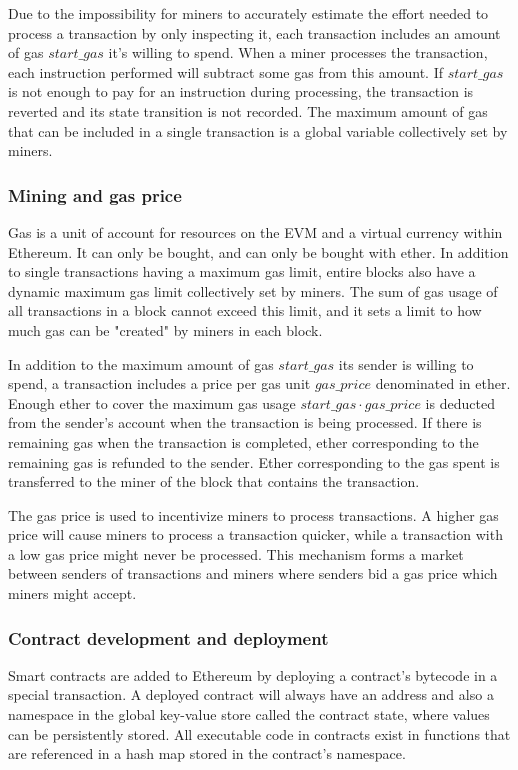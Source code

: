 Due to the impossibility for miners to accurately estimate the effort needed to process a transaction by only inspecting it, each transaction includes an amount of gas $start\_gas$ it's willing to spend. When a miner processes the transaction, each instruction performed will subtract some gas from this amount. If $start\_gas$ is not enough to pay for an instruction during processing, the transaction is reverted and its state transition is not recorded. The maximum amount of gas that can be included in a single transaction is a global variable collectively set by miners. 

\subsubsection{Mining and gas price}
Gas is a unit of account for resources on the EVM and a virtual currency within Ethereum. It can only be bought, and can only be bought with ether. In addition to single transactions having a maximum gas limit, entire blocks also have a dynamic maximum gas limit collectively set by miners. The sum of gas usage of all transactions in a block cannot exceed this limit, and it sets a limit to how much gas can be "created" by miners in each block. 

In addition to the maximum amount of gas $start\_gas$ its sender is willing to spend, a transaction includes a price per gas unit $gas\_price$ denominated in ether. Enough ether to cover the maximum gas usage $start\_gas \cdot gas\_price$ is deducted from the sender's account when the transaction is being processed. If there is remaining gas when the transaction is completed, ether corresponding to the remaining gas is refunded to the sender. Ether corresponding to the gas spent is transferred to the miner of the block that contains the transaction.

The gas price is used to incentivize miners to process transactions. A higher gas price will cause miners to process a transaction quicker, while a transaction with a low gas price might never be processed. This mechanism forms a market between senders of transactions and miners where senders bid a gas price which miners might accept. 

\subsubsection{Contract development and deployment}
Smart contracts are added to Ethereum by deploying a contract's bytecode in a special transaction. A deployed contract will always have an address and also a namespace in the global key-value store called the contract state, where values can be persistently stored. All executable code in contracts exist in functions that are referenced in a hash map stored in the contract's namespace.

